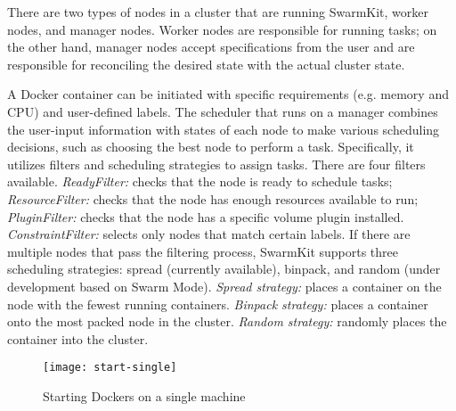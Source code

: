 There are two types of nodes in a cluster that are running SwarmKit, worker nodes, and manager nodes.
Worker nodes are responsible for running tasks; on the other hand, 
manager nodes accept specifications from the user and are responsible for reconciling the desired state with the actual cluster state.

A Docker container can be initiated with specific requirements (e.g. memory and CPU) and user-defined labels.
The scheduler that runs on a manager combines the user-input information with states of each node to make various scheduling decisions, 
such as choosing the best node to perform a task. 
Specifically, it utilizes filters and scheduling strategies to assign tasks. 
There are four filters available.
\emph{ReadyFilter:} checks that the node is ready to schedule tasks;
\emph{ResourceFilter:} checks that the node has enough resources available to run;
\emph{PluginFilter:} checks that the node has a specific volume plugin installed.
\emph{ConstraintFilter:} selects only nodes that match certain labels.
If there are multiple nodes that pass the filtering process, 
SwarmKit supports three scheduling strategies: spread (currently available), binpack, and random (under development based on Swarm Mode).
\emph{Spread strategy:} places a container on the node with the fewest running containers.
\emph{Binpack strategy:} places a container onto the most packed node in the cluster.
\emph{Random strategy:} randomly places the container into the cluster.

\begin{figure}[ht]
\centering
\texttt{[image: start-single]}
\caption{Starting Dockers on a single machine}
\label{fig:start-single} 
\end{figure}


